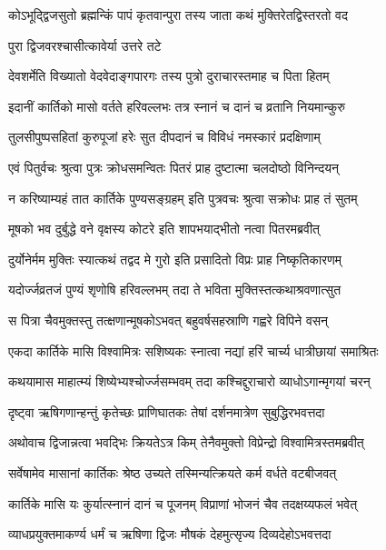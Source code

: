 \twolineshloka
{कोऽभूद्द्विजसुतो ब्रह्मन्किं पापं कृतवान्पुरा}
{तस्य जाता कथं मुक्तिरेतद्विस्तरतो वद} %



\onelineshloka
{पुरा द्विजवरश्चासीत्कावेर्या उत्तरे तटे} %

\twolineshloka
{देवशर्मेति विख्यातो वेदवेदाङ्गपारगः}
{तस्य पुत्रो दुराचारस्तमाह च पिता हितम्} %

\twolineshloka
{इदानीं कार्तिको मासो वर्तते हरिवल्लभः}
{तत्र स्नानं च दानं च व्रतानि नियमान्कुरु} %

\twolineshloka
{तुलसीपुष्पसहितां कुरुपूजां हरेः सुत}
{दीपदानं च विविधं नमस्कारं प्रदक्षिणाम्} %

\twolineshloka
{एवं पितुर्वचः श्रुत्वा पुत्रः क्रोधसमन्वितः}
{पितरं प्राह दुष्टात्मा चलदोष्ठो विनिन्दयन्} %


\twolineshloka
{न करिष्याम्यहं तात कार्तिके पुण्यसङ्ग्रहम्}
{इति पुत्रवचः श्रुत्वा सक्रोधः प्राह तं सुतम्} %

\twolineshloka
{मूषको भव दुर्बुद्धे वने वृक्षस्य कोटरे}
{इति शापभयाद्भीतो नत्वा पितरमब्रवीत्} %

\twolineshloka
{दुर्योनेर्मम मुक्तिः स्यात्कथं तद्वद मे गुरो}
{इति प्रसादितो विप्रः प्राह निष्कृतिकारणम्} %

\twolineshloka
{यदोर्ज्जव्रतजं पुण्यं शृणोषि हरिवल्लभम्}
{तदा ते भविता मुक्तिस्तत्कथाश्रवणात्सुत} %

\twolineshloka
{स पित्रा चैवमुक्तस्तु तत्क्षणान्मूषकोऽभवत्}
{बहुवर्षसहस्राणि गह्वरे विपिने वसन्} %

\twolineshloka
{एकदा कार्तिके मासि विश्वामित्रः सशिष्यकः}
{स्नात्वा नद्यां हरिं चार्च्य धात्रीछायां समाश्रितः} %

\twolineshloka
{कथयामास माहात्म्यं शिष्येभ्यश्चोर्ज्जसम्भवम्}
{तदा कश्चिद्दुराचारो व्याधोऽगान्मृगयां चरन्} %

\twolineshloka
{दृष्ट्वा ऋषिगणान्हन्तुं कृतेच्छः प्राणिघातकः}
{तेषां दर्शनमात्रेण सुबुद्धिरभवत्तदा} %

\twolineshloka
{अथोवाच द्विजान्नत्वा भवद्भिः क्रियतेऽत्र किम्}
{तेनैवमुक्तो विप्रेन्द्रो विश्वामित्रस्तमब्रवीत्} %


\twolineshloka
{सर्वेषामेव मासानां कार्तिकः श्रेष्ठ उच्यते}
{तस्मिन्यत्क्रियते कर्म वर्धते वटबीजवत्} %

\twolineshloka
{कार्तिके मासि यः कुर्यात्स्नानं दानं च पूजनम्}
{विप्राणां भोजनं चैव तदक्षय्यफलं भवेत्} %

\twolineshloka
{व्याधप्रयुक्तमाकर्ण्य धर्मं च ऋषिणा द्विजः}
{मौषकं देहमुत्सृज्य दिव्यदेहोऽभवत्तदा} %

